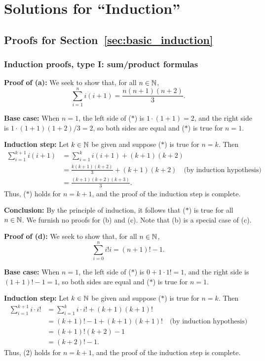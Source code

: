 \section{Solutions for ``Induction''}
\subsection{Proofs for Section~\ref{sec:basic_induction}}
\subsubsection{Induction proofs, type I: sum/product formulas}


\textbf{Proof of (a):}
We seek to show that, for all $n\in\mathbb{N}$,  
\[
\sum_{i=1}^n i(i+1)=\frac{n(n+1)(n+2)}{3}. 
\tag{$*$}
\]

\textbf{Base case:} When $n=1$, the left side of ($*$) is $1\cdot(1+1) =2$,
and the
right side is $1\cdot(1+1)(1+2)/3=2$, so both sides are equal and ($*$) is
true for $n=1$.

\textbf{Induction step:} Let $k\in\mathbb{N}$ be given and suppose 
($*$) is true for $n=k$. Then
\begin{align*}
\sum_{i=1}^{k+1}i(i+1)
&=
\sum_{i=1}^{k}i(i+1)
+(k+1)(k+2)
\\
&=\frac{k(k+1)(k+2)}{3} 
+(k+1)(k+2)
\quad \text{(by induction hypothesis)}
\\
&=\frac{(k+1)(k+2)(k+3)}{3}.
\end{align*}
Thus, ($*$) holds for $n=k+1$, and the proof of the induction step is complete. 

\textbf{Conclusion:} By the principle of induction,  it follows that
($*$) is true for all $n\in\mathbb{N}$.  
\medskip
We furnish no proofs for (b) and (c).  Note that (b) is a special case of (c).

\medskip


\textbf{Proof of (d):}
We seek to show that, for all $n\in\mathbb{N}$,
\[
\sum_{i=0}^n i! i
= (n+1)!-1. 
\tag{$*$}
\]

\textbf{Base case:} When $n=1$, the left side of ($*$) is $0+1 \cdot 1! =1$,
and the
right side is $(1+1)!-1=1$, so both sides are equal and ($*$) is
true for $n=1$.

\textbf{Induction step:} Let $k\in\mathbb{N}$ be given and suppose 
($*$) is true for $n=k$. Then
\begin{align*}
\sum_{i=1}^{k+1}i\cdot i!
&=
\sum_{i=1}^{k}i\cdot i! + (k+1)(k+1)!
\\
&= (k+1)!-1 + (k+1)(k+1)!
\quad \text{(by induction hypothesis)}
\\
&=(k+1)!(k+2)-1
\\
&=(k+2)!-1.
\end{align*}
Thus, (2) holds for $n=k+1$, and the proof of the induction step is complete. 


